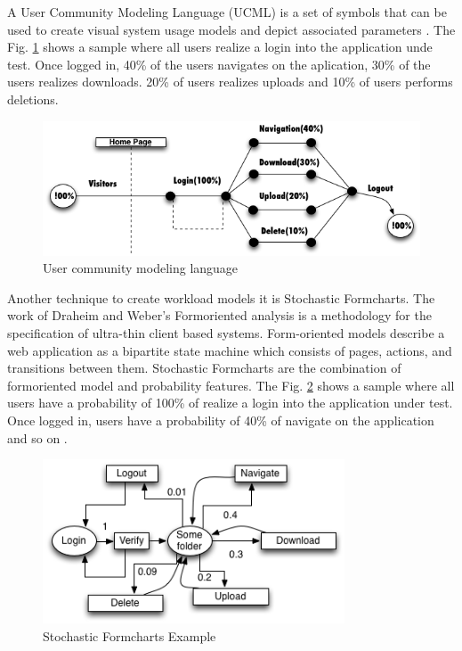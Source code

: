 A User Community Modeling Language (UCML) is a set of symbols that can be used to create visual system usage models and depict associated parameters \cite{Wang2013}. The Fig. \ref{fig:ucml} shows a sample where all users realize a login into the application unde test. Once logged in, 40\% of the users navigates on the aplication, 30\%  of the users realizes downloads. 20\% of users realizes uploads and 10\% of users performs deletions.



\begin{figure}[!ht]
\centering
\includegraphics[width=1\textwidth]{./images/ucml.png}
\caption{User community modeling language \cite{Wang2013}}
\label{fig:ucml}

\end{figure}

Another technique to create workload models it is Stochastic Formcharts. The work of Draheim and Weber’s Formoriented analysis is a methodology for the specification of ultra-thin client based systems. Form-oriented models describe a web application as a bipartite state machine which consists of pages, actions, and transitions between them. Stochastic Formcharts are the combination of formoriented model and probability features. The Fig. \ref{fig:stform} shows a sample where all users have a probability of 100\% of realize a login into the application under test. Once logged in, users have a probability of 40\% of navigate on the application and so on \cite{Draheim2006b}.


\begin{figure}[!ht]
\centering
\includegraphics[width=0.8\textwidth]{./images/stochastic.png}
\caption{Stochastic Formcharts Example \cite{Draheim2006b} \cite{Wang2013}}
\label{fig:stform}
\end{figure}

